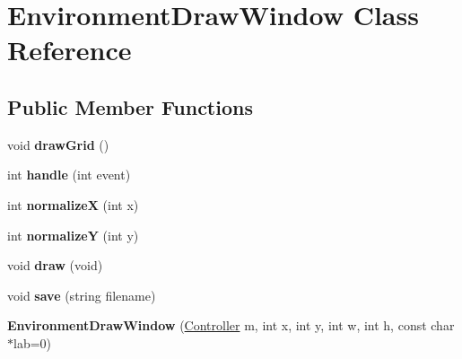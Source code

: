 \hypertarget{class_environment_draw_window}{
\section{EnvironmentDrawWindow Class Reference}
\label{class_environment_draw_window}
}
\subsection*{Public Member Functions}
\begin{DoxyCompactItemize}
\item 
\hypertarget{class_environment_draw_window_a89c0071b59b2f0bd92d3af3daa3281ae}{
void {\bfseries drawGrid} ()}
\label{class_environment_draw_window_a89c0071b59b2f0bd92d3af3daa3281ae}

\item 
\hypertarget{class_environment_draw_window_a20d7841b6c7b3441c1a4a418118960b2}{
int {\bfseries handle} (int event)}
\label{class_environment_draw_window_a20d7841b6c7b3441c1a4a418118960b2}

\item 
\hypertarget{class_environment_draw_window_a197a0405a52be37979e9f2fd840d25b2}{
int {\bfseries normalizeX} (int x)}
\label{class_environment_draw_window_a197a0405a52be37979e9f2fd840d25b2}

\item 
\hypertarget{class_environment_draw_window_a4ad94d20c389f3c6fefd4b5e63d97948}{
int {\bfseries normalizeY} (int y)}
\label{class_environment_draw_window_a4ad94d20c389f3c6fefd4b5e63d97948}

\item 
\hypertarget{class_environment_draw_window_a78fff980cb76a820b70c2e430a5a8322}{
void {\bfseries draw} (void)}
\label{class_environment_draw_window_a78fff980cb76a820b70c2e430a5a8322}

\item 
\hypertarget{class_environment_draw_window_a8f6cc793cd6596d26487f1f726c3d258}{
void {\bfseries save} (string filename)}
\label{class_environment_draw_window_a8f6cc793cd6596d26487f1f726c3d258}

\item 
\hypertarget{class_environment_draw_window_a9440ab68b6cc93153b0efdc8202c3eb8}{
{\bfseries EnvironmentDrawWindow} (\hyperlink{class_controller}{Controller} m, int x, int y, int w, int h, const char $\ast$lab=0)}
\label{class_environment_draw_window_a9440ab68b6cc93153b0efdc8202c3eb8}

\end{DoxyCompactItemize}
